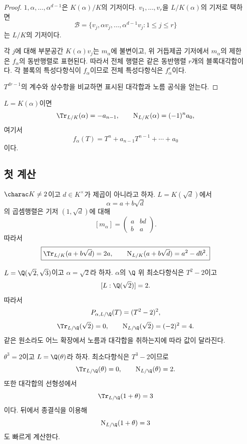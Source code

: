 \begin{proof}
$1,\alpha,\dots,\alpha^{d-1}$은 $K(\alpha)/K$의 기저이다. $v_1,\dots,v_r$을 $L/K(\alpha)$의 기저로 택하면
\[
  \mathcal B
  =\{v_j,\alpha v_j,\dots,\alpha^{d-1}v_j:1\le j\le r\}
\]
는 $L/K$의 기저이다.

각 $j$에 대해 부분공간 $K(\alpha)v_j$는 $m_\alpha$에 불변이고, 위 거듭제곱 기저에서 $m_\alpha$의 제한은 $f_\alpha$의 동반행렬로 표현된다. 따라서 전체 행렬은 같은 동반행렬 $r$개의 블록대각합이다. 각 블록의 특성다항식이 $f_\alpha$이므로 전체 특성다항식은 $f_\alpha^r$이다.

$T^{dr-1}$의 계수와 상수항을 비교하면 표시된 대각합과 노름 공식을 얻는다.
\end{proof}

\begin{corollary}
$L=K(\alpha)$이면
\[
  \Tr_{L/K}(\alpha)=-a_{n-1},
  \qquad
  \operatorname N_{L/K}(\alpha)=(-1)^n a_0,
\]
여기서
\[
  f_\alpha(T)=T^n+a_{n-1}T^{n-1}+\cdots+a_0
\]
이다.
\end{corollary}

\subsection{첫 계산}

\begin{example}[이차확장]
$\charac K\ne2$이고 $d\in K^\times$가 제곱이 아니라고 하자. $L=K(\sqrt d)$에서
\[
  \alpha=a+b\sqrt d
\]
의 곱셈행렬은 기저 $(1,\sqrt d)$에 대해
\[
  [m_\alpha]
  =\begin{pmatrix}
    a&bd\\
    b&a
  \end{pmatrix}.
\]
따라서
\[
  \boxed{
  \Tr_{L/K}(a+b\sqrt d)=2a,
  \qquad
  \operatorname N_{L/K}(a+b\sqrt d)=a^2-db^2.}
\]
\end{example}

\begin{example}[더 큰 체에서 같은 원소 보기]
$L=\Q(\sqrt2,\sqrt3)$이고 $\alpha=\sqrt2$라 하자. $\alpha$의 $\Q$ 위 최소다항식은 $T^2-2$이고
\[
  [L:\Q(\sqrt2)]=2.
\]
따라서
\[
  P_{\alpha,L/\Q}(T)=(T^2-2)^2,
\]
\[
  \Tr_{L/\Q}(\sqrt2)=0,
  \qquad
  \operatorname N_{L/\Q}(\sqrt2)=(-2)^2=4.
\]
같은 원소라도 어느 확장에서 노름과 대각합을 취하는지에 따라 값이 달라진다.
\end{example}

\begin{example}[순수 삼차확장]
$\theta^3=2$이고 $L=\Q(\theta)$라 하자. 최소다항식은 $T^3-2$이므로
\[
  \Tr_{L/\Q}(\theta)=0,
  \qquad
  \operatorname N_{L/\Q}(\theta)=2.
\]
또한 대각합의 선형성에서
\[
  \Tr_{L/\Q}(1+\theta)=3
\]
이다. 뒤에서 종결식을 이용해
\[
  \operatorname N_{L/\Q}(1+\theta)=3
\]
도 빠르게 계산한다.
\end{example}

